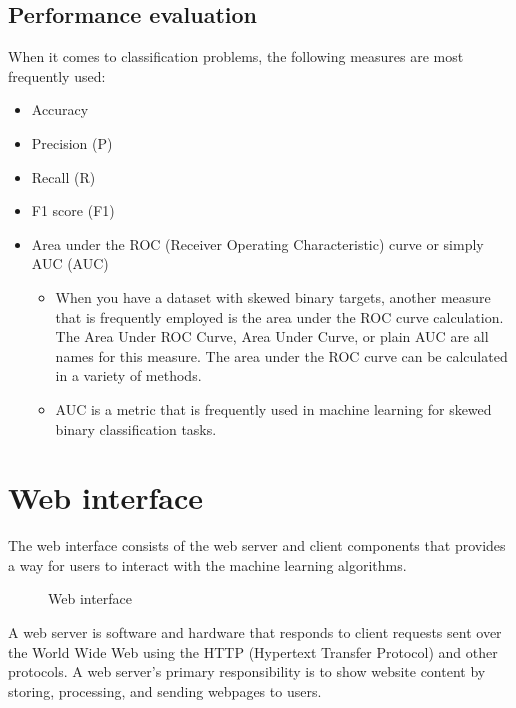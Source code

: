 
\subsection{Performance evaluation}
When it comes to classification problems, the following measures are most frequently used:

\begin{itemize}
	\item{Accuracy}
	\item{Precision (P)}
	\item{Recall (R)}
	\item{F1 score (F1)}
	\item{Area under the ROC (Receiver Operating Characteristic) curve or simply AUC (AUC)
		\begin{itemize}
			\item {When you have a dataset with skewed binary targets, another measure that is frequently employed is the area under the ROC curve calculation. The Area Under ROC Curve, Area Under Curve, or plain AUC are all names for this measure. The area under the ROC curve can be calculated in a variety of methods.}
			\item{AUC is a metric that is frequently used in machine learning for skewed binary classification tasks.}
		\end{itemize}
	}
\end{itemize}

\section{Web interface}
The web interface consists of the web server and client components that provides a way for users to interact with the machine learning algorithms.

\begin{figure}[htb]
\centering
{}
\caption{Web interface}
\label{fig:web-interface}
\end{figure}

A web server is software and hardware that responds to client requests sent over the World Wide Web using the HTTP (Hypertext Transfer Protocol) and other protocols. A web server's primary responsibility is to show website content by storing, processing, and sending webpages to users.

